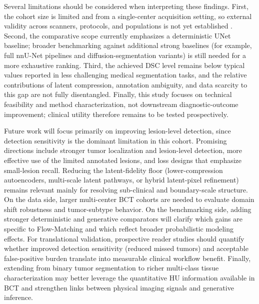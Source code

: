 \documentclass{iopjournal}
\begin{document}
Several limitations should be considered when interpreting these findings. First, the cohort size is limited and from a single-center acquisition setting, so external validity across scanners, protocols, and populations is not yet established \cite{shim2022fully, caballo2020mass}. Second, the comparative scope currently emphasizes a deterministic UNet baseline; broader benchmarking against additional strong baselines (for example, full nnU-Net pipelines and diffusion-segmentation variants) is still needed for a more exhaustive ranking. Third, the achieved DSC level remains below typical values reported in less challenging medical segmentation tasks, and the relative contributions of latent compression, annotation ambiguity, and data scarcity to this gap are not fully disentangled. Finally, this study focuses on technical feasibility and method characterization, not downstream diagnostic-outcome improvement; clinical utility therefore remains to be tested prospectively.

Future work will focus primarily on improving lesion-level detection, since detection sensitivity is the dominant limitation in this cohort. Promising directions include stronger tumor localization and lesion-level detection, more effective use of the limited annotated lesions, and loss designs that emphasize small-lesion recall. Reducing the latent-fidelity floor (lower-compression autoencoders, multi-scale latent pathways, or hybrid latent-pixel refinement) remains relevant mainly for resolving sub-clinical and boundary-scale structure. On the data side, larger multi-center BCT cohorts are needed to evaluate domain shift robustness and tumor-subtype behavior. On the benchmarking side, adding stronger deterministic and generative comparators will clarify which gains are specific to Flow-Matching and which reflect broader probabilistic modeling effects. For translational validation, prospective reader studies should quantify whether improved detection sensitivity (reduced missed tumors) and acceptable false-positive burden translate into measurable clinical workflow benefit. Finally, extending from binary tumor segmentation to richer multi-class tissue characterization may better leverage the quantitative HU information available in BCT and strengthen links between physical imaging signals and generative inference.
\end{document}
